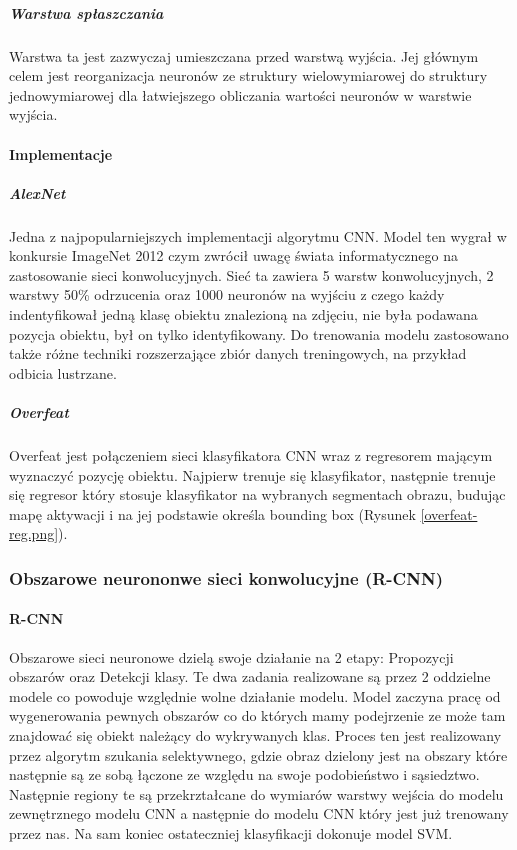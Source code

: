 \subparagraph{Warstwa spłaszczania}
Warstwa ta jest zazwyczaj umieszczana przed warstwą wyjścia. Jej głównym celem jest reorganizacja neuronów ze struktury wielowymiarowej do struktury jednowymiarowej dla łatwiejszego obliczania wartości neuronów w warstwie wyjścia.\cite{CNN-expl}

\paragraph{Implementacje}
\subparagraph{AlexNet}
Jedna z najpopularniejszych implementacji algorytmu CNN. Model ten wygrał w konkursie ImageNet 2012 czym zwrócił uwagę świata informatycznego na zastosowanie sieci konwolucyjnych.
Sieć ta zawiera 5 warstw konwolucyjnych, 2 warstwy 50\% odrzucenia oraz 1000 neuronów na wyjściu z czego każdy indentyfikował jedną klasę obiektu znalezioną na zdjęciu, nie była podawana pozycja obiektu, był on tylko identyfikowany. Do trenowania modelu zastosowano także różne techniki rozszerzające zbiór danych treningowych, na przykład odbicia lustrzane. \cite{AlexNet} \cite{ORdum-2}


\subparagraph{Overfeat}
Overfeat jest połączeniem sieci klasyfikatora CNN wraz z regresorem mającym wyznaczyć pozycję obiektu. Najpierw trenuje się klasyfikator, następnie trenuje się regresor który stosuje klasyfikator na wybranych segmentach obrazu, budując mapę aktywacji i na jej podstawie określa bounding box (Rysunek \ref{overfeat-reg.png}). \cite{Overfeat} \cite{ORdum-2}


\subsubsection{Obszarowe neurononwe sieci konwolucyjne (R-CNN)}

\paragraph{R-CNN}
Obszarowe sieci neuronowe dzielą swoje działanie na 2 etapy: Propozycji obszarów oraz Detekcji klasy. Te dwa zadania realizowane są przez 2 oddzielne modele co powoduje względnie wolne działanie modelu. Model zaczyna pracę od wygenerowania pewnych obszarów co do których mamy podejrzenie ze może tam znajdować się obiekt należący do wykrywanych klas. Proces ten jest realizowany przez algorytm szukania selektywnego, gdzie obraz dzielony jest na obszary które następnie są ze sobą łączone ze względu na swoje podobieństwo i sąsiedztwo.\cite{ORdum-1}  Następnie regiony te są przekrztałcane do wymiarów warstwy wejścia do modelu zewnętrznego modelu CNN a następnie do modelu CNN który jest już trenowany przez nas. Na sam koniec ostateczniej klasyfikacji dokonuje model SVM. \cite{ORdum-3}

